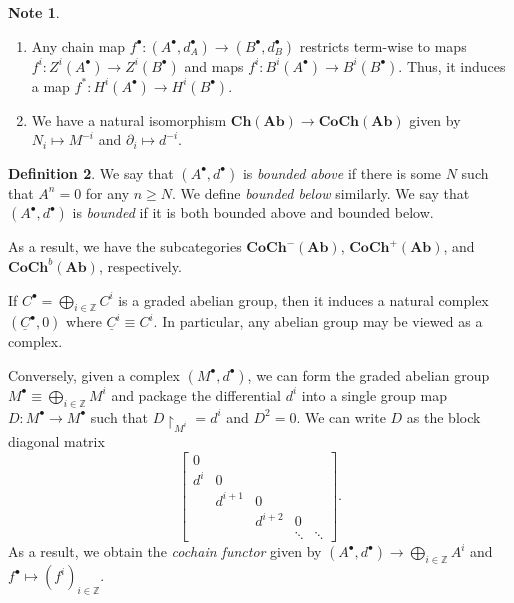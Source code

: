 \documentclass[10pt,letterpaper,cm]{nupset}
\theoremstyle{definition}
\newtheorem{definition}{Definition}[subsection]
\newtheorem{note}[definition]{Note}
\theoremstyle{theorem}
\theoremstyle{remark}
\newcommand{\Z}{\mathbb Z}
\newcommand{\1}{\mathbf{1}}
\newcommand{\0}{\vec 0}
\begin{document}
\begin{note} $ $
\begin{enumerate}
\item Any chain map $f^{\bullet}: \left(A^{\bullet}, d_A^{\bullet}\right) \to \left(B^{\bullet}, d_B^{\bullet}\right)$ restricts term-wise to maps $f^i :Z^i(A^{\bullet}) \to Z^i(B^{\bullet})$ and maps $f^i : B^i(A^{\bullet}) \to B^i(B^{\bullet})$. Thus, it induces a map $f^{\ast} : H^i(A^{\bullet}) \to H^i(B^{\bullet})$.
\item We have a natural isomorphism $\mathbf{Ch}(\mathbf{Ab}) \to \mathbf{CoCh}(\mathbf{Ab})$ given by $N_i \mapsto M^{-i}$ and $\partial_i \mapsto d^{-i}$.
\end{enumerate}
\end{note}

\begin{definition}
We say that $\left(A^{\bullet}, d^{\bullet}\right)$ is \textit{bounded above} if there is some $N$ such that $A^n =0$ for any $n\geq N$. We define \textit{bounded below} similarly. We say that $\left(A^{\bullet}, d^{\bullet}\right)$ is \textit{bounded} if it is both bounded above and bounded below. 
\end{definition}

As a result, we have the subcategories $\mathbf{CoCh}^{{-}}(\mathbf{Ab})$, $\mathbf{CoCh}^{+}(\mathbf{Ab})$, and $\mathbf{CoCh}^{b}(\mathbf{Ab})$, respectively. 

\medskip


If $C^{\bullet} = \bigoplus_{i\in \Z} C^i$ is a graded abelian group, then it induces a natural complex $\left(\underline{C}^{\bullet}, 0\right)$ where $\underline{C}^i \equiv C^i$. In particular, any abelian group may be viewed as a complex. 

Conversely, given a complex $\left(M^{\bullet}, d^{\bullet}\right)$, we can form the graded abelian group $M^{\bullet} \equiv  \bigoplus_{i\in \Z} M^i$ and package the differential $d^i$ into a single group map $D: M^{\bullet} \to M^{\bullet}$ such that $D\restriction_{M^i} = d^i$ and $D^2 =0$. We can write $D$ as the block diagonal matrix
$$  \begin{bmatrix} 0 & & &  & \\  d^i &0   &  &  & \\  &  d^{i+1} & 0  &   & \\ &   & d^{i+2}  & 0   &   \\  &  & &  \ddots &   \ddots \end{bmatrix} .$$
As a result, we obtain the \textit{cochain functor} given by $\left(A^{\bullet}, d^{\bullet}\right) \to \bigoplus_{i\in \Z} A^i$ and $f^{\bullet} \mapsto (f^i)_{i\in \Z}$.
\end{document}
